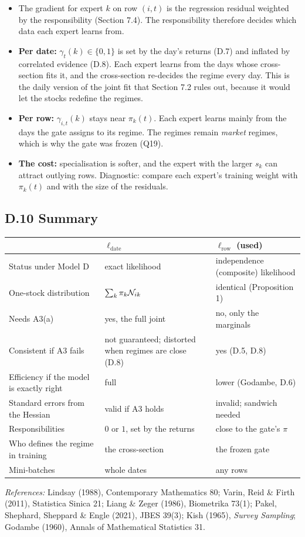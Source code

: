 \begin{itemize}
  \item The gradient for expert $k$ on row $(i,t)$ is the regression residual weighted by the responsibility (Section 7.4). The responsibility therefore decides which data each expert learns from.
  \item \textbf{Per date:} $\gamma_t(k)\in\{0,1\}$ is set by the day's returns (D.7) and inflated by correlated evidence (D.8). Each expert learns from the days whose cross-section fits it, and the cross-section re-decides the regime every day. This is the daily version of the joint fit that Section 7.2 rules out, because it would let the stocks redefine the regimes.
  \item \textbf{Per row:} $\gamma_{i,t}(k)$ stays near $\pi_k(t)$. Each expert learns mainly from the days the gate assigns to its regime. The regimes remain \emph{market} regimes, which is why the gate was frozen (Q19).
  \item \textbf{The cost:} specialisation is softer, and the expert with the larger $s_k$ can attract outlying rows. Diagnostic: compare each expert's training weight with $\pi_k(t)$ and with the size of the residuals.
\end{itemize}

\subsection*{D.10 Summary}

\begin{center}
\small\renewcommand{\arraystretch}{1.3}
\begin{tabularx}{\textwidth}{@{}p{3.9cm}XX@{}}
\toprule
 & $\ell_{\text{date}}$ & $\ell_{\text{row}}$ (used) \\
\midrule
Status under Model D & exact likelihood & independence (composite) likelihood \\
One-stock distribution & $\sum_k\pi_k\mathcal{N}_{ik}$ & identical (Proposition 1) \\
Needs A3(a) & yes, the full joint & no, only the marginals \\
Consistent if A3 fails & not guaranteed; distorted when regimes are close (D.8) & yes (D.5, D.8) \\
Efficiency if the model is exactly right & full & lower (Godambe, D.6) \\
Standard errors from the Hessian & valid if A3 holds & invalid; sandwich needed \\
Responsibilities & $0$ or $1$, set by the returns & close to the gate's $\pi$ \\
Who defines the regime in training & the cross-section & the frozen gate \\
Mini-batches & whole dates & any rows \\
\bottomrule
\end{tabularx}
\end{center}

\emph{References:} Lindsay (1988), Contemporary Mathematics 80; Varin, Reid \& Firth (2011), Statistica Sinica 21; Liang \& Zeger (1986), Biometrika 73(1); Pakel, Shephard, Sheppard \& Engle (2021), JBES 39(3); Kish (1965), \emph{Survey Sampling}; Godambe (1960), Annals of Mathematical Statistics 31.
